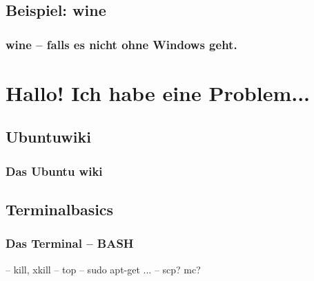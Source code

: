 \documentclass{beamer}
\begin{document}
        \subsection{Beispiel: wine}
            \begin{frame}
          		\frametitle{wine -- falls es nicht ohne Windows geht.}
        		\begin{minipage}{0.44\textwidth}
        		
        		\end{minipage}%
        		\begin{minipage}{0.54\textwidth}
        		
        		\end{minipage}
        	\end{frame}
        	
    \section{Hallo! Ich habe eine Problem...}
        \subsection{Ubuntuwiki}
            \begin{frame}
          		\frametitle{Das Ubuntu wiki}
        		\begin{minipage}{0.44\textwidth}
        		
        		\end{minipage}%
        		\begin{minipage}{0.54\textwidth}
        		
        		\end{minipage}
        	\end{frame}
        	
	    \subsection{Terminalbasics}
    	    \begin{frame}
          		\frametitle{Das Terminal -- BASH}
          		-- kill, xkill 
                -- top 
                -- sudo apt-get ...
                -- scp? mc?    	
        		\begin{minipage}{0.44\textwidth}
        		    
        		\end{minipage}%
        		\begin{minipage}{0.54\textwidth}
        		
        		\end{minipage}
        	\end{frame}
        	
\end{document}
